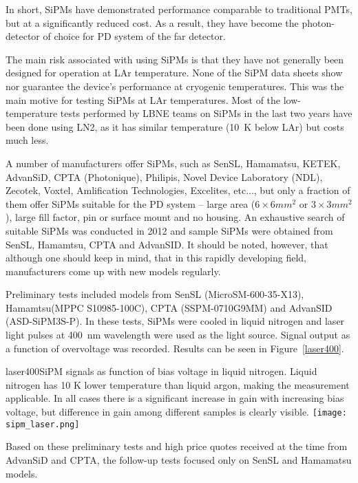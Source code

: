 In short, SiPMs have demonstrated performance comparable to
traditional PMTs, but at a significantly reduced cost. As a result,
they have become the photon-detector of choice for PD system of
the far detector.

The main risk associated with using SiPMs is that they have not
generally been designed for operation at LAr temperature. None of the
SiPM data sheets show nor guarantee the device's performance
at cryogenic temperatures. This was the main motive for testing SiPMs
at LAr temperatures.  Most of the low-temperature tests performed by
LBNE teams on SiPMs in the last two years have been done using LN2, as
it has similar temperature (10~K below LAr) but costs much less.

A number of manufacturers offer SiPMs, such as SenSL, Hamamatsu,
KETEK, AdvanSiD, CPTA (Photonique), Philipis, Novel Device Laboratory
(NDL), Zecotek, Voxtel, Amlification Technologies, Excelites, etc...,
but only a fraction of them offer SiPMs suitable for the PD system --
large area ($6\times6 mm^2$ or $3\times3 mm^2$), large fill factor,
pin or surface mount and no housing. An exhaustive search of suitable
SiPMs was conducted in 2012 and sample SiPMs were obtained from SenSL,
Hamamtsu, CPTA and AdvanSID. It should be noted, however, that
although one should keep in mind, that in this rapidly developing
field, manufacturers come up with new models regularly.

Preliminary tests included models from SenSL (MicroSM-600-35-X13),
Hamamtsu(MPPC S10985-100C), CPTA (SSPM-0710G9MM) and AdvanSID
(ASD-SiPM3S-P).  In these tests, SiPMs were cooled in liquid nitrogen
and laser light pulses at 400~nm wavelength were used as the light
source. Signal output as a function of overvoltage was recorded. Results
can be seen in Figure~\ref{laser400}.

\begin{cdrfigure}{laser400}{SiPM signals as function of bias voltage in
    liquid nitrogen. Liquid nitrogen has 10 K lower temperature than
    liquid argon, making the measurement applicable. In all cases
    there is a significant increase in gain with increasing bias
    voltage, but difference in gain among different samples is clearly
    visible.} 
  \texttt{[image: sipm\_laser.png]}
\end{cdrfigure}

Based on these preliminary tests and high price quotes received at the
time from AdvanSiD and CPTA, the follow-up tests focused only on SenSL and
Hamamatsu models. 

